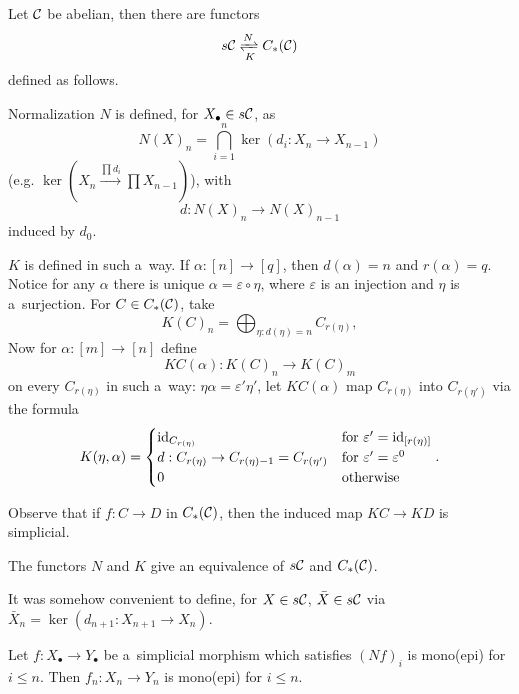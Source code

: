 \pagebreak    
    \begin{definition}
        Let $\mathcal{C}$ be abelian, then there are functors 
        $$ s\C \xrightleftharpoons[K]{N} C_\ast(\C)$$
        defined as follows.
        
        Normalization $N$ is defined, for $X_\bullet \in s\mathcal{C}$, as
        $$N(X)_n = \bigcap_{i=1}^n \ker(d_i:X_n \to X_{n-1})$$
        (e.g. $\ker \left(X_n \xrightarrow{\prod d_i} \prod X_{n-1}\right)$),
        with $$d:N(X)_n \to N(X)_{n-1}$$
        induced by $d_0$.
        
        $K$ is defined in such a~way. 
        If $\alpha:[n]\to[q]$, then $d(\alpha) = n$ and $r(\alpha)=q$.
        Notice for any $\alpha$ there is unique
        $\alpha=\varepsilon \circ \eta$,
        where $\varepsilon$ is an injection and $\eta$ is a~surjection.
        For $C \in C_\ast(\mathcal{C})$, take
        $$K(C)_n = \bigoplus_{\eta:d(\eta)=n} C_{r(\eta)},$$
        Now for $\alpha :[m]\to[n]$
        define $$KC(\alpha):K(C)_n \to K(C)_m$$
        on every $C_{r(\eta)}$ in such a~way:
        $\eta \alpha = \varepsilon' \eta'$,
        let $KC(\alpha)$ map $C_{r(\eta)}$
        into $C_{r(\eta')}$
        via the formula
        $$K(\eta, \alpha) = 
        \begin{cases}
            \mathrm{id}_{C_{r(\eta)}} &\text{for }\varepsilon'=\mathrm{id}_{[r(\eta)]}\\
            d:C_{r(\eta)}\to C_{r(\eta)-1} = C_{r(\eta')} 
                &\text{for }\varepsilon'=\varepsilon^0 \\
            0 &\text{otherwise}
        \end{cases}.$$
    \end{definition}
    
    \begin{remark}
        Observe that if $f:C\to D$ in $C_\ast(\mathcal{C})$,
        then the induced map $KC \to KD$ is simplicial.
    \end{remark}
    
    \begin{theorem}
        The functors $N$ and $K$ give 
        an equivalence of $s\mathcal{C}$ and $C_\ast(\mathcal{C})$.
    \end{theorem}
    
    \begin{remark}
        It was somehow convenient to define,
        for $X \in s\mathcal{C}$, $\bar{X} \in s\mathcal{C}$
        via \\ $\bar{X}_n = \ker(d_{n+1}:X_{n+1} \to X_n)$.
    \end{remark}
    
    \begin{lemma}
        Let $f:X_\bullet \to Y_\bullet$ be a~simplicial morphism 
        which satisfies $(Nf)_i$ is mono(epi) for $i \leq n$.
        Then $f_n:X_n \to Y_n$ is mono(epi) for $i \leq n$.
    \end{lemma}



 
 